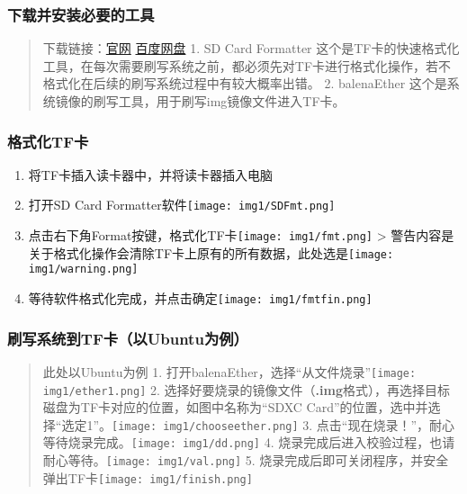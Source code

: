 \hypertarget{ux4e0bux8f7dux5e76ux5b89ux88c5ux5fc5ux8981ux7684ux5de5ux5177}{%
\subsubsection{下载并安装必要的工具}\label{ux4e0bux8f7dux5e76ux5b89ux88c5ux5fc5ux8981ux7684ux5de5ux5177}}

\begin{quote}
下载链接：\href{http://www.orangepi.cn/html/hardWare/computerAndMicrocontrollers/service-and-support/Orange-Pi-AIpro.html}{官网}
\href{https://pan.baidu.com/s/1Jho73pw91r5GJD2KijY45Q?pwd=3xuz\#list/path=\%2F}{百度网盘}
1. SD Card Formatter
这个是TF卡的快速格式化工具，在每次需要刷写系统之前，都必须先对TF卡进行格式化操作，若不格式化在后续的刷写系统过程中有较大概率出错。
2. balenaEther 这个是系统镜像的刷写工具，用于刷写img镜像文件进入TF卡。
\end{quote}

\hypertarget{ux683cux5f0fux5316tfux5361}{%
\subsubsection{格式化TF卡}\label{ux683cux5f0fux5316tfux5361}}

\begin{enumerate}
\def\labelenumi{\arabic{enumi}.}
\tightlist
\item
  将TF卡插入读卡器中，并将读卡器插入电脑
\item
  打开SD Card Formatter软件\texttt{[image: img1/SDFmt.png]}
\item
  点击右下角Format按键，格式化TF卡\texttt{[image: img1/fmt.png]}
  \textgreater{}
  警告内容是关于格式化操作会清除TF卡上原有的所有数据，此处选是\texttt{[image: img1/warning.png]}
\item
  等待软件格式化完成，并点击确定\texttt{[image: img1/fmtfin.png]}
\end{enumerate}

\hypertarget{ux5237ux5199ux7cfbux7edfux5230tfux5361ux4ee5ubuntuux4e3aux4f8b}{%
\subsubsection{刷写系统到TF卡（以Ubuntu为例）}\label{ux5237ux5199ux7cfbux7edfux5230tfux5361ux4ee5ubuntuux4e3aux4f8b}}

\begin{quote}
此处以Ubuntu为例 1.
打开balenaEther，选择``从文件烧录''\texttt{[image: img1/ether1.png]} 2.
选择好要烧录的镜像文件（\textbf{.img}格式），再选择目标磁盘为TF卡对应的位置，如图中名称为``SDXC
Card''的位置，选中并选择``选定1''。\texttt{[image: img1/chooseether.png]}
3. 点击``现在烧录！''，耐心等待烧录完成。\texttt{[image: img1/dd.png]}
4. 烧录完成后进入校验过程，也请耐心等待。\texttt{[image: img1/val.png]}
5.
烧录完成后即可关闭程序，并安全弹出TF卡\texttt{[image: img1/finish.png]}
\end{quote}

